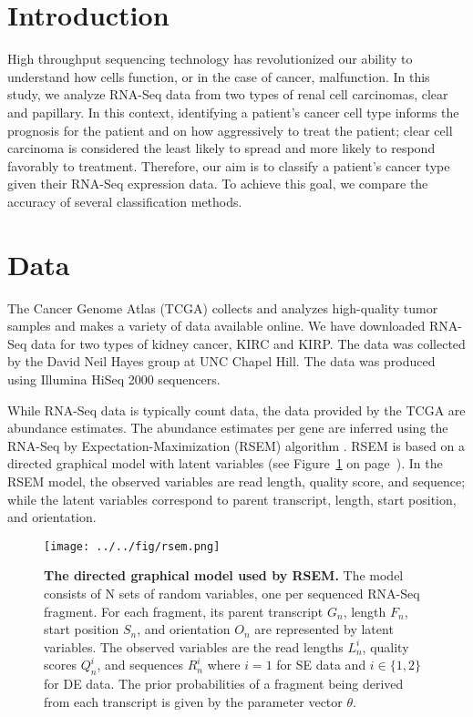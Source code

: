 \section{Introduction}

High throughput sequencing technology has revolutionized our ability to
understand how cells function, or in the case of cancer, malfunction. In this
study, we analyze RNA-Seq data from two types of renal cell carcinomas, clear
and papillary.  In this context, identifying a patient's cancer cell type
informs the prognosis for the patient and on how aggressively to treat the
patient; clear cell carcinoma is considered the least likely to spread and more
likely to respond favorably to treatment. Therefore, our aim is to classify a
patient's cancer type given their RNA-Seq expression data. To achieve this
goal, we compare the accuracy of several classification methods.

\section{Data}

The Cancer Genome Atlas (TCGA) collects and analyzes high-quality tumor samples
and makes a variety of data available online. We have downloaded RNA-Seq data
for two types of kidney cancer, KIRC and KIRP. The data was collected by the
David Neil Hayes group at UNC Chapel Hill. The data was produced using Illumina
HiSeq 2000 sequencers. 

While RNA-Seq data is typically count data, the data provided by the TCGA are
abundance estimates.  The abundance estimates per gene are inferred using the
RNA-Seq by Expectation-Maximization (RSEM) algorithm \cite{li2011rsem}.
RSEM is based on a directed graphical model with latent variables (see
Figure~\ref{fig:rsem} on page~\pageref{fig:rsem}). In the RSEM model,
the observed variables are read length, quality score, and sequence; while
the latent variables correspond to parent transcript, length, start position,
and orientation.

\begin{figure}[H]
  \centering
    \texttt{[image: ../../fig/rsem.png]}
\caption{\textbf{The directed graphical model used by RSEM.} The model consists of N
sets of random variables, one per sequenced RNA-Seq fragment. For each fragment,
its parent transcript $G_n$, length $F_n$, start position  $S_n$, and orientation $O_n$
are represented by latent variables. The observed variables are the read lengths
$L_n^i$, quality scores $Q_n^i$, and sequences $R_n^i$ where $i = 1$ for SE data and
$i \in \{1,2\}$ for DE data. The prior probabilities of a
fragment being derived from each transcript is given by the parameter vector $\theta$.}
   \label{fig:rsem}
\end{figure}


